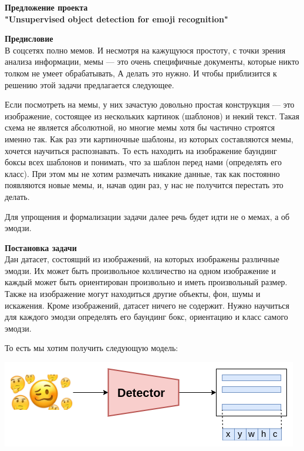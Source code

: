 \documentclass[12pt]{article}
\begin{document}
	\begin{center}
		\textbf{Предложение проекта}\\
		\textbf{"Unsupervised object detection for emoji recognition"}\\
	\end{center}
	
	\textbf{Предисловие}\\
	В соцсетях полно мемов. И несмотря на кажущуюся простоту, с точки зрения анализа информации, мемы --- это очень специфичные документы, которые никто толком не умеет обрабатывать, А делать это нужно. И чтобы приблизится к решению этой задачи предлагается следующее.
	
	Если посмотреть на мемы, у них зачастую довольно простая конструкция --- это изображение, состоящее из нескольких картинок (шаблонов) и некий текст. Такая схема не является абсолютной, но многие мемы хотя бы частично строятся именно так. Как раз эти картиночные шаблоны, из которых составляются мемы, хочется научиться распознавать. То есть находить на изображение баундинг боксы всех шаблонов и понимать, что за шаблон перед нами (определять его класс). При этом мы не хотим размечать никакие данные, так как постоянно появляются новые мемы, и, начав один раз, у нас не получится перестать это делать. 
	
	Для упрощения и формализации задачи далее речь будет идти не о мемах, а об эмодзи.
	
	\textbf{Постановка задачи}\\
	Дан датасет, состоящий из изображений, на которых изображены различные эмодзи. Их может быть произвольное колличество на одном изображение и каждый может быть ориентирован произвольно и иметь произвольный размер. Также на изображение могут находиться другие объекты, фон, шумы и искажения. Кроме изображений, датасет ничего не содержит.
	Нужно научиться для каждого эмодзи определять его баундинг бокс, ориентацию и класс самого эмодзи.
	
	То есть мы хотим получить следующую модель:
	
	\centerline{\includegraphics[scale=1.0]{images/model_architecture_target.png}}
	
\end{document}
